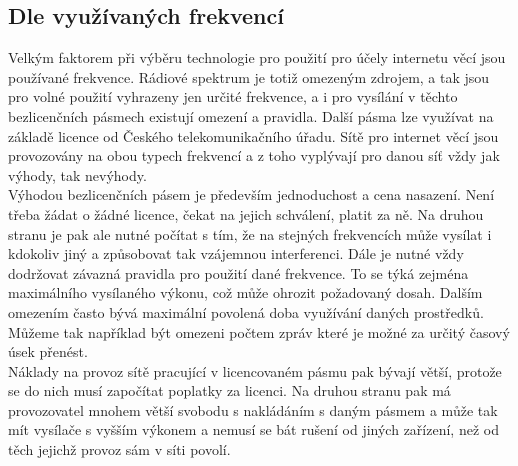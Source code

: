 \documentclass{ctuthesis}
\begin{document}
\subsection{Dle využívaných frekvencí}
Velkým faktorem při výběru technologie pro použití pro účely internetu věcí jsou používané frekvence. Rádiové spektrum je totiž omezeným zdrojem, a tak jsou pro volné použití vyhrazeny jen určité frekvence, a i pro vysílání v těchto bezlicenčních pásmech existují omezení a pravidla. Další pásma lze využívat na základě licence od Českého telekomunikačního úřadu. Sítě pro internet věcí jsou provozovány na obou typech frekvencí a z toho vyplývají pro danou síť vždy jak výhody, tak nevýhody.\\
Výhodou bezlicenčních pásem je především jednoduchost a cena nasazení. Není třeba žádat o žádné licence, čekat na jejich schválení, platit za ně. Na druhou stranu je pak ale nutné počítat s tím, že na stejných frekvencích může vysílat i kdokoliv jiný a způsobovat tak vzájemnou interferenci. Dále je nutné vždy dodržovat závazná pravidla pro použití dané frekvence. To se týká zejména maximálního vysílaného výkonu, což může ohrozit požadovaný dosah. Dalším omezením často bývá maximální povolená doba využívání daných prostředků. Můžeme tak například být omezeni počtem zpráv které je možné za určitý časový úsek přenést.\\
Náklady na provoz sítě pracující v licencovaném pásmu pak bývají větší, protože se do nich musí započítat poplatky za licenci. Na druhou stranu pak má provozovatel mnohem větší svobodu s nakládáním s daným pásmem a může tak mít vysílače s vyšším výkonem a nemusí se bát rušení od jiných zařízení, než od těch jejichž provoz sám v síti povolí.
\end{document}
